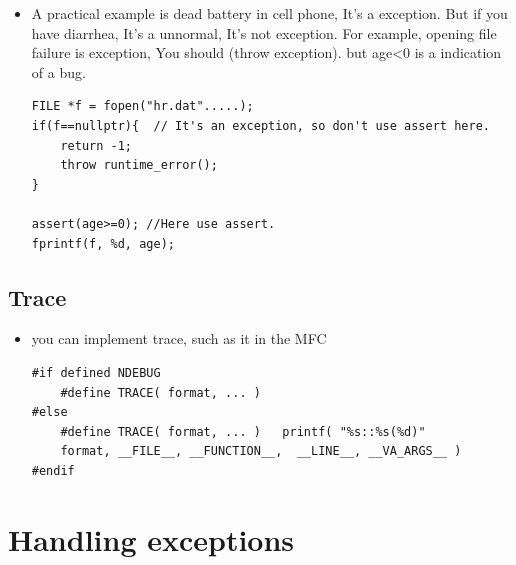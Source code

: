 \documentclass[a4paper,11pt,twoside]{book}
\begin{document}
\begin{itemize}
	\item A practical example is dead battery in cell phone, It's a exception. But if you have diarrhea, It's a unnormal, It's not exception. For example, opening file failure is exception, You should (throw exception). but age<0 is a indication of a bug.
\begin{lstlisting}[numbers=none]
	FILE *f = fopen("hr.dat".....);
if(f==nullptr){  // It's an exception, so don't use assert here.
	return -1;
	throw runtime_error();
}
	
assert(age>=0); //Here use assert.
fprintf(f, %d, age);
\end{lstlisting}
	
\end{itemize}

\subsection{Trace}
\begin{itemize}
	\item you can implement trace, such as it in the MFC
\begin{lstlisting}[numbers=none]
#if defined NDEBUG
	#define TRACE( format, ... )
#else
	#define TRACE( format, ... )   printf( "%s::%s(%d)"
	format, __FILE__, __FUNCTION__,  __LINE__, __VA_ARGS__ )
#endif
	\end{lstlisting}
	
\end{itemize}

\section{Handling exceptions}
\end{document}
